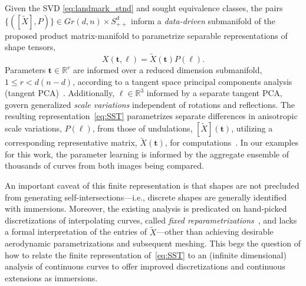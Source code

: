 \documentclass[pdflatex,iicol]{sn-jnl}%
\theoremstyle{thmstyleone}%
\theoremstyle{thmstyletwo}%
\theoremstyle{thmstylethree}%
\begin{document}
Given the SVD \eqref{eq:landmark_stnd} and sought equivalence classes, the pairs $\lbrace([\widetilde{X}], P)\rbrace \in Gr(d,n) \times S^d_{++}$ inform a \emph{data-driven} submanifold of the proposed product matrix-manifold to parametrize separable representations of shape tensors,
\begin{equation}\label{eq:SST}
    X(\boldsymbol{t},\boldsymbol{\ell}) = \widetilde{X}(\boldsymbol{t})P(\boldsymbol{\ell}).
\end{equation}
Parameters $\boldsymbol{t} \in \mathbb{R}^r$ are informed over a reduced dimension submanifold, $1\leq r < d(n-d)$, according to a tangent space principal components analysis (tangent PCA)~\cite{fletcher2004principal}. Additionally, $\boldsymbol{\ell}\in \mathbb{R}^3$ informed by a separate tangent PCA, govern generalized \emph{scale variations} independent of rotations and reflections. The resulting representation~\eqref{eq:SST} parametrizes separate differences in anisotropic scale variations, $P(\boldsymbol{\ell})$, from those of undulations, $[\widetilde{X}](\boldsymbol{t})$, utilizing a corresponding representative matrix, $\widetilde{X}(\boldsymbol{t})$, for computations~\cite{edelman1998geometry, grey2023separable}. In our examples for this work, the parameter learning is informed by the aggregate ensemble of thousands of curves from both images being compared.

An important caveat of this finite representation is that shapes are not precluded from generating self-intersections---i.e., discrete shapes are generally identified with immersions. Moreover, the existing analysis is predicated on hand-picked discretizations of interpolating curves, called \emph{fixed reparametrizations}~\cite{grey2023separable}, and lacks a formal interpretation of the entries of $\widetilde{X}$---other than achieving desirable aerodynamic parametrizations and subsequent meshing. This begs the question of how to relate the finite representation of~\eqref{eq:SST} to an (infinite dimensional) analysis of continuous curves to offer improved discretizations and continuous extensions as immersions.

\end{document}

